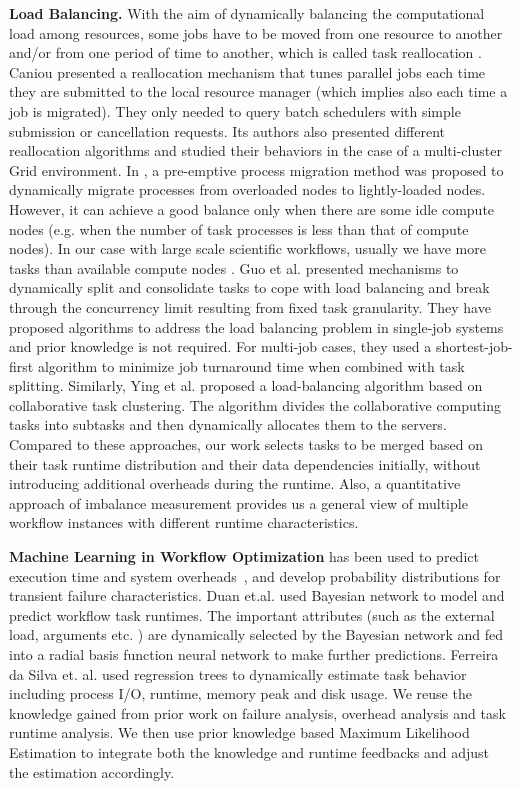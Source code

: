 \textbf{Load Balancing.} With the aim of dynamically balancing the computational load among resources, some jobs have to be moved from one resource to another and/or from one period of time to another, which is called task reallocation \cite{Tomas2012}. Caniou  \cite{Caniou2011} presented a reallocation mechanism that tunes parallel jobs each time they are submitted to the local resource manager (which implies also each time a job is migrated). They only needed to query batch schedulers with simple submission or cancellation requests.  Its authors also presented different reallocation algorithms and studied their behaviors in the case of a multi-cluster Grid environment. In \cite{Zhang2000}, a pre-emptive process migration method was proposed to dynamically migrate processes from overloaded nodes to lightly-loaded nodes. However, it can achieve a good balance only when there are some idle compute nodes (e.g. when the number of task processes is less than that of compute nodes). In our case with large scale scientific workflows, usually we have more tasks than available compute nodes . 
Guo et al. \cite{Zhenhua2011} presented mechanisms to dynamically split and consolidate tasks to cope with load balancing and break through the concurrency limit resulting from fixed task granularity. They have proposed algorithms to address the load balancing problem in single-job systems and prior knowledge is not required. For multi-job cases, they used a shortest-job-first algorithm to minimize job turnaround time when combined with task splitting. Similarly, Ying et al. \cite{Ying2009} proposed a load-balancing algorithm based on collaborative task clustering. The algorithm divides the collaborative computing tasks into subtasks and then dynamically allocates them to the servers. Compared to these approaches, our work selects tasks to be merged based on their task runtime distribution and their data dependencies initially, without introducing additional overheads during the runtime. Also, a quantitative approach of imbalance measurement provides us a general view of multiple workflow instances with different runtime characteristics. 



\textbf{Machine Learning in Workflow Optimization} has been used to predict execution time \cite{Rubing2009, 1015660, 1542747, da2013toward} and system overheads~\cite{Chen2011}, and develop probability distributions for transient failure characteristics. Duan et.al. \cite{Rubing2009} used Bayesian network to model and predict workflow task runtimes. The important attributes (such as the external load, arguments etc. ) are dynamically selected by the Bayesian network and fed into a radial basis function neural network to make further predictions. Ferreira da Silva et. al. \cite{da2013toward} used regression trees to dynamically estimate task behavior including process I/O, runtime, memory peak and disk usage. We reuse the knowledge gained from prior work on failure analysis, overhead analysis and task runtime analysis. We then use prior knowledge based Maximum Likelihood Estimation to integrate both the knowledge and runtime feedbacks and adjust the estimation accordingly. 



